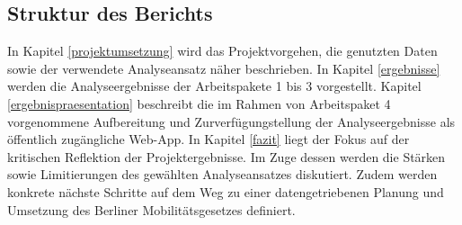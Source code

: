 \subsection{Struktur des Berichts}
In Kapitel \ref{projektumsetzung} wird das Projektvorgehen, die genutzten Daten sowie der verwendete Analyseansatz näher beschrieben. In Kapitel \ref{ergebnisse} werden die Analyseergebnisse der Arbeitspakete 1 bis 3 vorgestellt. Kapitel \ref{ergebnispraesentation} beschreibt die im Rahmen von Arbeitspaket 4 vorgenommene Aufbereitung und Zurverfügungstellung der Analyseergebnisse als öffentlich zugängliche Web-App. In Kapitel \ref{fazit} liegt der Fokus auf der kritischen Reflektion der Projektergebnisse. Im Zuge dessen werden die Stärken sowie Limitierungen des gewählten Analyseansatzes diskutiert. Zudem werden konkrete nächste Schritte auf dem Weg zu einer datengetriebenen Planung und Umsetzung des Berliner Mobilitätsgesetzes definiert.
